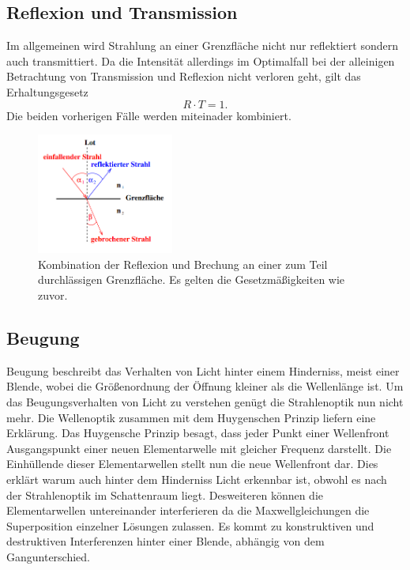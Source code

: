 \subsection{Reflexion und Transmission}
Im allgemeinen wird Strahlung an einer Grenzfläche nicht nur reflektiert sondern auch transmittiert. Da die Intensität allerdings im Optimalfall bei der alleinigen Betrachtung von Transmission und Reflexion nicht verloren geht, gilt das Erhaltungsgesetz
\begin{equation*}
R \cdot T = 1.
\end{equation*}
Die beiden vorherigen Fälle werden miteinader kombiniert.
\begin{figure}
    \centering
    \includegraphics[width=0.4\textwidth]{bilder/3.png}
    \caption{Kombination der Reflexion und Brechung an einer zum Teil durchlässigen Grenzfläche. Es gelten die Gesetzmäßigkeiten wie zuvor. \cite{skript}}
    \label{fig:combo}
\end{figure}

\subsection{Beugung}
Beugung beschreibt das Verhalten von Licht hinter einem Hinderniss, meist einer Blende, wobei die Größenordnung der Öffnung kleiner als die Wellenlänge ist.
Um das Beugungsverhalten von Licht zu verstehen genügt die Strahlenoptik nun nicht mehr. Die Wellenoptik zusammen mit dem Huygenschen Prinzip liefern eine Erklärung. Das Huygensche Prinzip besagt, dass jeder Punkt einer Wellenfront
Ausgangspunkt einer neuen Elementarwelle mit gleicher Frequenz darstellt. Die Einhüllende dieser Elementarwellen stellt nun die neue Wellenfront dar. Dies erklärt warum auch hinter dem Hinderniss Licht erkennbar ist, obwohl es 
nach der Strahlenoptik im Schattenraum liegt. Desweiteren können die Elementarwellen untereinander interferieren da die Maxwellgleichungen die Superposition einzelner Lösungen zulassen. Es kommt zu konstruktiven und destruktiven
Interferenzen hinter einer Blende, abhängig von dem Gangunterschied.